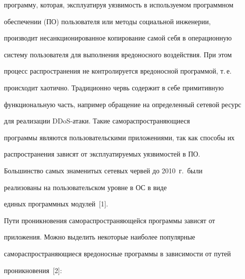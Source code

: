программу, которая, эксплуатируя уязвимость в используемом программном 


обеспечении (ПО) пользователя или методы социальной инженерии, 


производит несанкционированное копирование самой себя в операционную 


систему пользователя для выполнения вредоносного воздействия. При этом 


процесс распространения не контролируется вредоносной программой, т.\,е.\ 


происходит хаотично. Традиционно червь содержит в себе примитивную 


функциональную часть, например обращение на определенный сетевой ресурс 


для реализации {DDoS}-атаки. Такие самораспространяющиеся 


программы являются пользовательскими приложениями, так как способы их 


распространения зависят от эксплуатируемых уязвимостей в ПО. 


Большинство самых знаменитых сетевых червей до 2010~г.\ были 


реализованы на пользовательском уровне в ОС в виде 


единых программных модулей~[1].


     


     Пути проникновения самораспространяющейся программы зависят от 


приложения. Можно выделить некоторые наиболее популярные 


самораспространяющиеся вредоносные программы в зависимости от путей 


проникновения~[2]:


